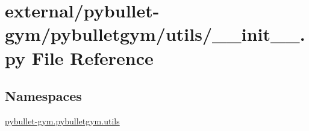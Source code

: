 \hypertarget{external_2pybullet-gym_2pybulletgym_2utils_2____init_____8py}{}\section{external/pybullet-\/gym/pybulletgym/utils/\+\_\+\+\_\+init\+\_\+\+\_\+.py File Reference}
\label{external_2pybullet-gym_2pybulletgym_2utils_2____init_____8py}
\subsection*{Namespaces}
\begin{DoxyCompactItemize}
\item 
 \hyperlink{namespacepybullet-gym_1_1pybulletgym_1_1utils}{pybullet-\/gym.\+pybulletgym.\+utils}
\end{DoxyCompactItemize}
